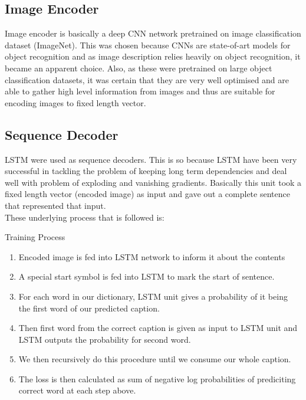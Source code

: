\documentclass[11pt]{article}
\begin{document}
		\subsection{Image Encoder}
			Image encoder is basically a deep CNN network pretrained on image classification dataset (ImageNet). This was chosen because CNNs are state-of-art models for object recognition and as image description relies heavily on object recognition, it became an apparent choice. Also, as these were pretrained on large object classification datasets, it was certain that they are very well optimised and are able to gather high level information from images and thus are suitable for encoding images to fixed length vector.
		\subsection{Sequence Decoder}
			LSTM were used as sequence decoders. This is so because LSTM have been very successful in tackling the problem of keeping long term dependencies and deal well with problem of exploding and vanishing gradients. Basically this unit took a fixed length vector (encoded image) as input and gave out a complete sentence that represented that input.\\
			These underlying process that is followed is:
			\begin{subsubsection}{Training Process}
				\begin{enumerate}
				\item Encoded image is fed into LSTM network to inform it about the contents
				\item A special start symbol is fed into LSTM to mark the start of sentence.
				\item For each word in our dictionary, LSTM unit gives a probability of it being the first word of our predicted caption.
				\item Then first word from the correct caption is given as input to LSTM unit and LSTM outputs the probability for second word.
				\item We then recursively do this procedure until we consume our whole caption.
				\item The loss is then calculated as sum of negative log probabilities of prediciting correct word at each step above.
				\end{enumerate}
			\end{subsubsection}
\end{document}
